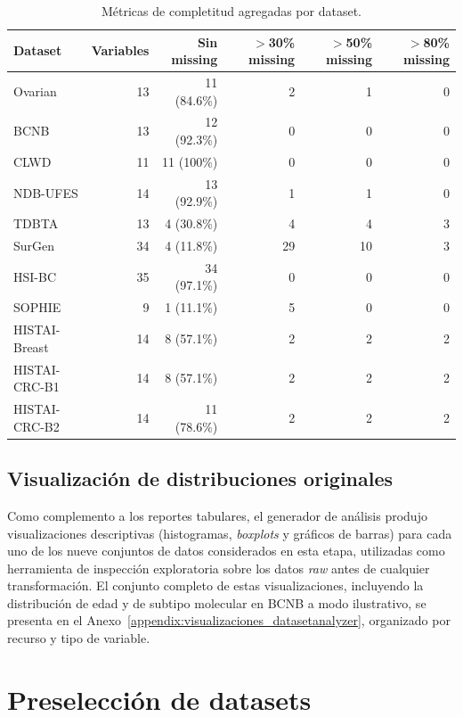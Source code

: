 \begin{table}[htbp]
\centering
\caption{Métricas de completitud agregadas por dataset.}
\label{tab:completitud_agregada}
\small
\begin{tabular}{lrrrrr}
\toprule
Dataset & Variables & Sin missing & $>$30\% missing & $>$50\% missing & $>$80\% missing \\
\midrule
Ovarian              & 13 & 11 (84.6\%) &  2 &  1 &  0 \\
BCNB                 & 13 & 12 (92.3\%) &  0 &  0 &  0 \\
CLWD                 & 11 & 11 (100\%)  &  0 &  0 &  0 \\
NDB-UFES             & 14 & 13 (92.9\%) &  1 &  1 &  0 \\
TDBTA                & 13 &  4 (30.8\%) &  4 &  4 &  3 \\
SurGen               & 34 &  4 (11.8\%) & 29 & 10 &  3 \\
HSI-BC             & 35 & 34 (97.1\%) &  0 &  0 &  0 \\
SOPHIE               &  9 &  1 (11.1\%) &  5 &  0 &  0 \\
HISTAI-Breast        & 14 &  8 (57.1\%) &  2 &  2 &  2 \\
HISTAI-CRC-B1 & 14 &  8 (57.1\%) &  2 &  2 &  2 \\
HISTAI-CRC-B2 & 14 & 11 (78.6\%) &  2 &  2 &  2 \\
\bottomrule
\end{tabular}
\end{table}

\subsection{Visualización de distribuciones originales}
\label{sec:visualizacion_distribuciones}

Como complemento a los reportes tabulares, el generador de análisis produjo visualizaciones descriptivas (histogramas, \textit{boxplots} y gráficos de barras) para cada uno de los nueve conjuntos de datos considerados en esta etapa, utilizadas como herramienta de inspección exploratoria sobre los datos \textit{raw} antes de cualquier transformación. El conjunto completo de estas visualizaciones, incluyendo la distribución de edad y de subtipo molecular en BCNB a modo ilustrativo, se presenta en el Anexo~\ref{appendix:visualizaciones_datasetanalyzer}, organizado por recurso y tipo de variable.

\section{Preselección de datasets}
\label{sec:preseleccion}

